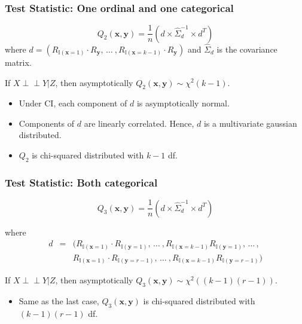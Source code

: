 \documentclass{beamer}
\def\ci{\perp\!\!\!\!\!\perp}
\begin{document}
\begin{frame}
	\frametitle{Test Statistic: One ordinal and one categorical}
	$$ Q_2(\bm{x}, \bm{y}) = \frac{1}{n} (d \times \hat{\Sigma}_d^{-1} \times d^T) $$
	where $ d = (R_{\mathbb{I}(\mathbf{x}=1)} \cdot R_{\mathbf{y}}, \, \ldots \ ,
		R_{\mathbb{I}(\mathbf{x}=k-1)} \cdot R_{\mathbf{y}})$ and $ \hat{\Sigma}_d $ is the covariance matrix.

	\vspace{1em}
	If $ X \ci Y | Z $, then asymptotically $ Q_2(\bm{x}, \bm{y}) \sim \chi^2(k-1) $.

	\begin{itemize}
		\item Under CI, each component of $ d $ is asymptotically normal.
		\item Components of $ d $ are linearly correlated. Hence, $ d $ is 
			a multivariate gaussian distributed.
		\item $ Q_2 $ is chi-squared distributed with $ k-1 $ df.
	\end{itemize}
\end{frame}

\begin{frame}
	\frametitle{Test Statistic: Both categorical}

	$$ Q_3(\bm{x}, \bm{y}) = \frac{1}{n} (d \times \hat{\Sigma}_d^{-1} \times d^T) $$

	where 
	\begin{eqnarray*}
		d &  =  & (R_{\mathbb{I}(\mathbf{x}=1)} \cdot R_{\mathbb{I}(\mathbf{y}=1)}, \, \ldots \ ,
		R_{\mathbb{I}(\mathbf{x}=k-1)} R_{\mathbb{I}(\mathbf{y}=1)}, \, \ldots \, ,
		\\
	 	& & R_{\mathbb{I}(\mathbf{x}=1)} \cdot R_{\mathbb{I}(\mathbf{y}=r-1)}, \, \ldots \ ,
		R_{\mathbb{I}(\mathbf{x}=k-1)} R_{\mathbb{I}(\mathbf{y}=r-1)}
		)
	\end{eqnarray*}
	\vspace{1em}

	If $ X \ci Y | Z $, then asymptotically $ Q_3(\bm{x}, \bm{y}) \sim \chi^2((k-1)(r-1)) $.

	\begin{itemize}
		\setlength\itemsep{1em}
		\item Same as the last case, $ Q_3(\bm{x}, \bm{y}) $ is chi-squared distributed 
			with $ (k-1)(r-1) $ df.
	\end{itemize}
\end{frame}
\end{document}
